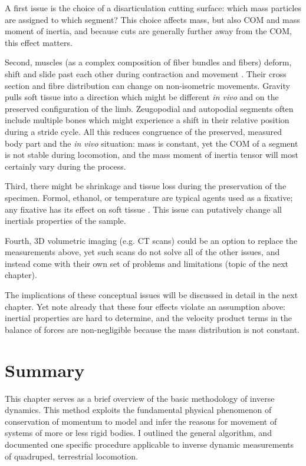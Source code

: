 \documentclass[10pt,a4paper]{article}
\begin{document}
A first issue is the choice of a disarticulation cutting surface: which mass particles are assigned to which segment?
This choice affects mass, but also COM and mass moment of inertia, and because cuts are generally further away from the COM, this effect matters.

Second, muscles (as a complex composition of fiber bundles and fibers) deform, shift and slide past each other during contraction and movement \citep{Bol2013}.
Their cross section and fibre distribution can change on non-isometric movements.
Gravity pulls soft tissue into a direction \citep{Hansraj2022} which might be different \emph{in vivo} and on the preserved configuration of the limb.
Zeugopodial and autopodial segments often include multiple bones which might experience a shift in their relative position during a stride cycle.
All this reduces congruence of the preserved, measured body part and the \emph{in vivo} situation: mass is constant, yet the COM of a segment is not stable during locomotion, and the mass moment of inertia tensor will most certainly vary during the process.

Third, there might be shrinkage and tissue loss during the preservation of the specimen.
Formol, ethanol, or temperature are typical agents used as a fixative; any fixative has its effect on soft tissue \citep{Buytaert2014,Pech1987}.
This issue can putatively change all inertials properties of the sample.

Fourth, 3D volumetric imaging (e.g. CT scans) could be an option to replace the measurements above, yet such scans do not solve all of the other issues, and instead come with their own set of problems and limitations (topic of the next chapter).



The implications of these conceptual issues will be discussed in detail in the next chapter.
Yet note already that these four effects violate an assumption above: inertial properties are hard to determine, and the velocity product terms in the balance of forces are non-negligible because the mass distribution is not constant.


\clearpage
\section{Summary}
\label{sec:org042a5b2}
This chapter serves as a brief overview of the basic methodology of inverse dynamics.
This method exploits the fundamental physical phenomenon of conservation of momentum to model and infer the reasons for movement of systems of more or less rigid bodies.
I outlined the general algorithm, and documented one specific procedure applicable to inverse dynamic measurements of quadruped, terrestrial locomotion.
\end{document}

